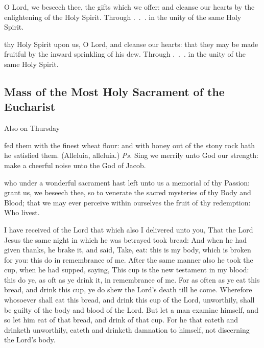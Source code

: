 
\secret
{} O Lord, we beseech thee, the gifts which we offer: and cleanse our hearts by the enlightening of the Holy Spirit.  Through .~.~. in the unity of the same Holy Spirit.


\postcommunion
{} thy Holy Spirit upon us, O Lord, and cleanse our hearts: that they may be made fruitful by the inward sprinkling of his dew.  Through .~.~. in the unity of the same Holy Spirit.


\subsection{Mass of the Most Holy Sacrament of the Eucharist}
\begin{inhead}
	Also on Thursday
\end{inhead}

\introit
{} fed them with the finest wheat flour: and with honey out of the stony rock hath he satisfied them. (Alleluia, alleluia.) \textit{Ps.} Sing we merrily unto God our strength: make a cheerful noise unto the God of Jacob. 

\collect
{} who under a wonderful sacrament hast left unto us a memorial of thy Passion: grant us, we beseech thee, so to venerate the sacred mysteries of thy Body and Blood; that we may ever perceive within ourselves the fruit of thy redemption: Who livest.

 I have received of the Lord that which also I delivered unto you, That the Lord Jesus the same night in which he was betrayed took bread: And when he had given thanks, he brake it, and said, Take, eat: this is my body, which is broken for you: this do in remembrance of me. After the same manner also he took the cup, when he had supped, saying, This cup is the new testament in my blood: this do ye, as oft as ye drink it, in remembrance of me. For as often as ye eat this bread, and drink this cup, ye do shew the Lord's death till he come. Wherefore whosoever shall eat this bread, and drink this cup of the Lord, unworthily, shall be guilty of the body and blood of the Lord. But let a man examine himself, and so let him eat of that bread, and drink of that cup. For he that eateth and drinketh unworthily, eateth and drinketh damnation to himself, not discerning the Lord's body.

